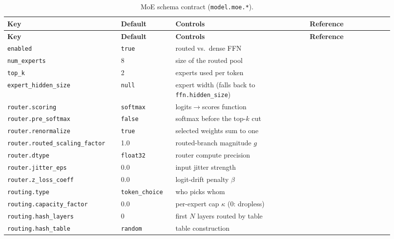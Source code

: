 {\small
\begin{longtable}{@{}L{0.27\linewidth}L{0.13\linewidth}L{0.32\linewidth}L{0.20\linewidth}@{}}
\caption{MoE schema contract (\texttt{model.moe.*}).}\label{tab:moe-schema}\\
\toprule
\textbf{Key} & \textbf{Default} & \textbf{Controls} & \textbf{Reference} \\
\midrule
\endfirsthead
\toprule
\textbf{Key} & \textbf{Default} & \textbf{Controls} & \textbf{Reference} \\
\midrule
\endhead
\texttt{enabled} & \texttt{true} & routed vs.\ dense FFN & \citet{shazeer2017moe} \\
\texttt{num\_experts} & 8 & size of the routed pool & \citet{fedus2021switch} \\
\texttt{top\_k} & 2 & experts used per token & \citet{fedus2021switch} \\
\texttt{expert\_hidden\_size} & \texttt{null} & expert width (falls back to \texttt{ffn.hidden\_size}) & \citet{deepseek2024v3} \\
\texttt{router.scoring} & \texttt{softmax} & logits$\to$scores function & \citet{deepseek2024v3,deepseek2026v4} \\
\texttt{router.pre\_softmax} & \texttt{false} & softmax before the top-$k$ cut & \citet{fedus2021switch} \\
\texttt{router.renormalize} & \texttt{true} & selected weights sum to one & \citet{krajewski2025scaling} \\
\texttt{router.routed\_scaling\_factor} & 1.0 & routed-branch magnitude $g$ & \citet{deepseek2024v3,kimiteam2026k3} \\
\texttt{router.dtype} & \texttt{float32} & router compute precision & \citet{fedus2021switch,zoph2022stmoe} \\
\texttt{router.jitter\_eps} & 0.0 & input jitter strength & \citet{fedus2021switch} \\
\texttt{router.z\_loss\_coeff} & 0.0 & logit-drift penalty $\beta$ & \citet{zoph2022stmoe} \\
\texttt{routing.type} & \texttt{token\_choice} & who picks whom & \citet{zhou2022expertchoice} \\
\texttt{routing.capacity\_factor} & 0.0 & per-expert cap $\kappa$ (0: dropless) & \citet{pangu2025ultra} \\
\texttt{routing.hash\_layers} & 0 & first $N$ layers routed by table & \citet{roller2021hash,deepseek2026v4} \\
\texttt{routing.hash\_table} & \texttt{random} & table construction & \citet{roller2021hash} \\

\end{longtable}}
